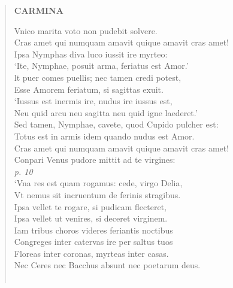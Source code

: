\documentclass[11pt, a4paper]{report}
\begin{document}
\begin{verse}
     \marginpar{[172]} \begin{center} \textbf{CARMINA} \end{center}Vnico marita voto non pudebit solvere. \\ Cras amet qui numquam amavit quique amavit cras amet! \\ Ipsa Nymphas diva luco iussit ire myrteo: \\ ‘Ite, Nymphae, posuit arma, feriatus est Amor.’ \\ lt puer comes puellis; nec tamen credi potest, \\ Esse Amorem feriatum, si sagittas exuit. \\ ‘Iussus est inermis ire, nudus ire iussus est, \\ Neu quid arcu neu sagitta neu quid igne laederet.’ \\ Sed tamen, Nymphae, cavete, quod Cupido pulcher est: \\ Totus est in armis idem quando nudus est Amor. \\ Cras amet qui numquam amavit quique amavit cras amet! \\ Conpari Venus pudore mittit ad te virgines: \\ \textit{p. 10} \\ ‘Vna res est quam rogamus: cede, virgo Delia, \\ Vt nemus sit incruentum de ferinis stragibus. \\ Ipsa vellet te rogare, si pudicam flecteret, \\ Ipsa vellet ut venires, si deceret virginem. \\ Iam tribus choros videres feriantis noctibus \\ Congreges inter catervas ire per saltus tuos \\ Floreas inter coronas, myrteas inter casas. \\ Nec Ceres nec Bacchus absunt nec poetarum deus. \\ 
        ﻿\pagebreak 

\end{verse}
\end{document}

